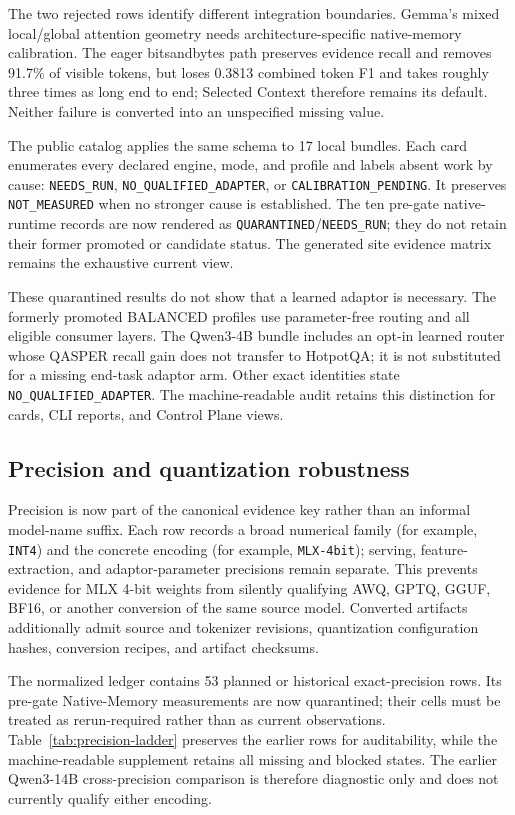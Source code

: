 \documentclass[11pt]{article}
\begin{document}
The two rejected rows identify different integration boundaries. Gemma's mixed
local/global attention geometry needs architecture-specific native-memory
calibration. The eager bitsandbytes path preserves evidence recall and removes
91.7\% of visible tokens, but loses 0.3813 combined token F1 and takes roughly
three times as long end to end; Selected Context therefore remains its default.
Neither failure is converted into an unspecified missing value.

The public catalog applies the same schema to 17 local bundles. Each card
enumerates every declared engine, mode, and profile and labels absent work by
cause: \texttt{NEEDS\_RUN}, \texttt{NO\_QUALIFIED\_ADAPTER}, or
\texttt{CALIBRATION\_PENDING}. It preserves \texttt{NOT\_MEASURED} when no
stronger cause is established. The ten pre-gate native-runtime records are now
rendered as \texttt{QUARANTINED}/\texttt{NEEDS\_RUN}; they do not retain their
former promoted or candidate status. The generated site evidence matrix remains
the exhaustive current view.

These quarantined results do not show that a learned adaptor is necessary. The formerly promoted
BALANCED profiles use parameter-free routing and all eligible consumer layers.
The Qwen3-4B bundle includes an opt-in learned router whose QASPER recall gain
does not transfer to HotpotQA; it is not substituted for a missing end-task
adaptor arm. Other exact identities state \texttt{NO\_QUALIFIED\_ADAPTER}.
The machine-readable audit retains this distinction for cards, CLI reports,
and Control Plane views.

\subsection{Precision and quantization robustness}

Precision is now part of the canonical evidence key rather than an informal
model-name suffix.  Each row records a broad numerical family (for example,
\texttt{INT4}) and the concrete encoding (for example,
\texttt{MLX-4bit}); serving, feature-extraction, and adaptor-parameter
precisions remain separate.  This prevents evidence for MLX 4-bit weights from
silently qualifying AWQ, GPTQ, GGUF, BF16, or another conversion of the same
source model.  Converted artifacts additionally admit source and tokenizer
revisions, quantization configuration hashes, conversion recipes, and artifact
checksums.

The normalized ledger contains 53 planned or historical exact-precision rows.
Its pre-gate Native-Memory measurements are now quarantined; their cells must be
treated as rerun-required rather than as current observations.
Table~\ref{tab:precision-ladder} preserves the earlier rows for auditability,
while the machine-readable supplement retains all missing and blocked states.
The earlier Qwen3-14B cross-precision comparison is therefore diagnostic only
and does not currently qualify either encoding.
\end{document}
